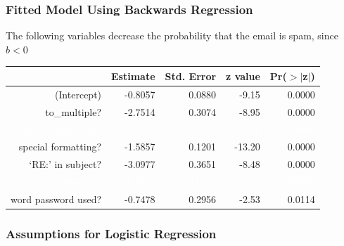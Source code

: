 \documentclass[handout]{beamer}
\newcommand{\blue}[1]{\textcolor{blue2}{#1}}
\newcommand{\white}[1]{\textcolor{white}{#1}}
\begin{document}
\begin{frame}[fragile]
\frametitle{Fitted Model Using Backwards Regression}
The following variables decrease the probability that the email is spam, since $b<0$

\begin{table}[ht]
\centering
\begin{tabular}{r|rrrr}
  \hline
 & Estimate & Std. Error & z value & Pr($>$$|$z$|$) \\ 
  \hline
(Intercept) & -0.8057 & 0.0880 & -9.15 & 0.0000 \\ 
  \blue{to\_multiple?} & \blue{-2.7514} & \blue{0.3074} & \blue{-8.95} & \blue{0.0000} \\ 
  \white{word winner used?} & \white{1.7251} & \white{0.3245} & \white{5.32} & \white{0.0000} \\ 
  \blue{special formatting?} & \blue{-1.5857} & \blue{0.1201} & \blue{-13.20} & \blue{0.0000} \\ 
  \blue{`RE:' in subject?} & \blue{-3.0977} & \blue{0.3651} & \blue{-8.48} & \blue{0.0000} \\ 
  \white{attachment?} & \white{0.2127} & \white{0.0572} & \white{3.72} & \white{0.0002} \\ 
  \blue{word password used?} & \blue{-0.7478} & \blue{0.2956} & \blue{-2.53} & \blue{0.0114} \\ 
   \hline
\end{tabular}
\end{table} 

\end{frame}


\begin{frame}[fragile]
\frametitle{Assumptions for Logistic Regression}

%
%
%

\end{frame}
\end{document}
